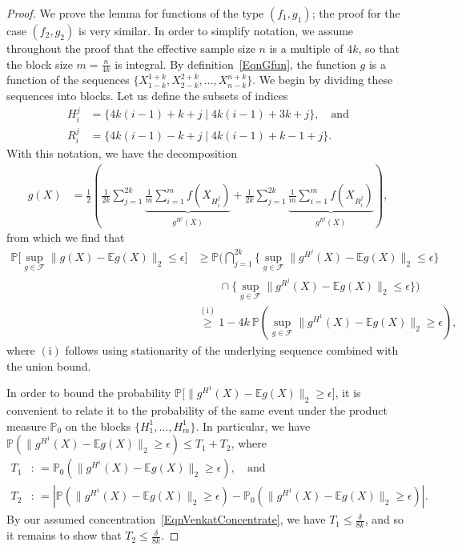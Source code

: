 \documentclass[twoside,11pt]{article}
\newcommand{\numobs}{\ensuremath{n}}
\def\EE{ \mathbb{E} }
\newcommand{\subsize}{\numobs} %
\newcommand{\blocksize}{\ensuremath{m}}
\newcommand{\oddblockindeces}[2]{H^{#1}_{#2}}
\newcommand{\evenblockindeces}[2]{R^{#1}_{#2}}
\newcommand{\mprob}{\ensuremath{\mathbb{P}}}
\newcommand{\defn}{: \, = }
\newcommand{\kdim}{\ensuremath{k}}
\begin{document}
%
\begin{proof}
We prove the lemma for functions of the type $(f_1, g_1)$; the proof
for the case $(f_2, g_2)$ is very similar.  In order to simplify
notation, we assume throughout the proof that the effective sample
size $\subsize$ is a multiple of $4\kdim $, so that the block size
$\blocksize = \frac{\subsize}{4 \kdim}$ is integral.  By
definition~\eqref{EqnGfun}, the function $g$ is a function of the
sequences $\{X_{1-k}^{1+k},
X_{2-k}^{2+k},\ldots,X_{\subsize-k}^{\subsize+k}\}$.  We begin by
dividing these sequences into blocks.  Let us define the subsets of
indices
\begin{align*}
\oddblockindeces{j}{i} &= \{ 4k(i-1)+k+j \mid 4k(i-1) +3k +j\}, \quad
\mbox{and} \\
%
 \evenblockindeces{j}{i} &= \{4k(i-1) -k+j \mid
4k(i-1) +k - 1 +j\}.
\end{align*}
With this notation, we have the decomposition
\begin{align*}
g(X) & = \frac{1}{2} \left(\frac{1}{2k}\sum_{j=1}^{2k}
\underbrace{\frac{1}{\blocksize} \sum_{i=1}^\blocksize
  f(X_{H_i^j})}_{g^{H^j}(X)} + \frac{1}{2k} \sum_{j=1}^{2k}
\underbrace{\frac{1}{\blocksize} \sum_{i=1}^\blocksize
  f(X_{R_i^j})}_{g^{R^j}(X)} \right),
\end{align*}
from which we find that
\begin{align*}
\mprob \big[ \sup_{g\in \mathcal{F}} \| g(X) - \EE g(X)\|_2 \leq \epsilon \big] & \geq \mprob
\big( \bigcap_{j=1}^{2k} \{\sup_{g\in\mathcal{F}}\| g^{H^j}(X)- \EE g(X) \|_2 \leq
\epsilon\}\\
&\qquad \cap \{ \sup_{g\in\mathcal{F}}\| g^{R^j}(X) - \EE g(X)\|_2 \leq \epsilon\} \big)\\
% 
&\stackrel{\mathrm{(i)}}{\geq} 1 - 4 \kdim \: \mprob(
\sup_{g\in\mathcal{F}}\| g^{H^1}(X) - \EE g(X)\|_2 \geq \epsilon),
\end{align*}
where $\mathrm{(i)}$ follows using stationarity of the underlying
sequence combined with the union bound.


In order to bound the probability $\mprob \big[ \| g^{H^1}(X) - \EE
  g(X)\|_2 \geq \epsilon\big]$, it is convenient to relate it to the
probability of the same event under the product measure $\mprob_0$ on
the blocks $\{H^1_1,\ldots, H^1_{\blocksize}\}.$ In particular, we
have $\mprob(\| g^{H^1}(X) - \EE g(X)\|_2 \geq \epsilon) \leq T_1 +
T_2$, where
\begin{align*}
T_1 & \defn \mprob_0(\| g^{H^1}(X) - \EE g(X)\|_2 \geq \epsilon),
\quad \mbox{and} \\
%
T_2 &\defn |\mprob(\| g^{H^1}(X) - \EE g(X)\|_2 \geq \epsilon) -
\mprob_0(\| g^{H^1}(X) - \EE g(X)\|_2 \geq \epsilon)|.
\end{align*}
By our assumed concentration~\eqref{EqnVenkatConcentrate}, we have
$T_1 \leq \frac{\delta}{8k}$, and so it remains to show that $T_2
\leq \frac{\delta}{8k}$.


\end{proof}
\end{document}
